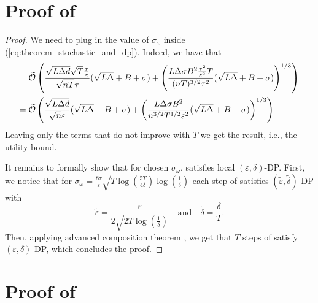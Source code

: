 \documentclass[a4paper,11pt]{article}
\begin{document}
\section{Proof of }\label{appendix:corollary_1}



\theoremdputility*

\begin{proof}
    We need to plug in the value of $\sigma_{\omega}$ inside (\ref{eq:theorem_stochastic_and_dp}). Indeed, we have that 
    \begin{align*}
        & \widetilde{\mathcal O}\left(\frac{\sqrt{L\Delta d} \sqrt{T}\frac{\tau}{\varepsilon}}{\sqrt{n T}\tau}(\sqrt{L\Delta} + B + \sigma)
        + \left(\frac{L\Delta\sigma B^2 \frac{\tau^2}{\varepsilon^2}T}{(nT)^{3/2}\tau^2}(\sqrt{L\Delta} + B + \sigma)\right)^{1/3}
        \right)\\
        =\;& \widetilde{\mathcal O}\left(\frac{\sqrt{L\Delta d} }{\sqrt{n}\varepsilon}(\sqrt{L\Delta} + B + \sigma)
        + \left(\frac{L\Delta\sigma B^2}{n^{3/2}T^{1/2}\varepsilon^2}(\sqrt{L\Delta} + B + \sigma)\right)^{1/3}
        \right)
    \end{align*}
    Leaving only the terms that do not improve with $T$ we get the result, i.e., the utility bound.

    It remains to formally show that for chosen $\sigma_{\omega}$,  satisfies local $(\varepsilon, \delta)$-DP. First, we notice that for $\sigma_{\omega} = \frac{8\tau}{\varepsilon}\sqrt{T\log\left(\frac{5T}{4\delta}\right)\log\left(\frac{1}{\delta}\right)}$ each step of  satisfies $(\tilde{\varepsilon}, \tilde{\delta})$-DP \citep[Theorem 3.22]{dwork2014algorithmic} with
    \begin{equation*}
        \tilde{\varepsilon} = \frac{\varepsilon}{2\sqrt{2T\log(\frac{1}{\delta})}} \quad \text{and}\quad \tilde{\delta} = \frac{\delta}{T}.
    \end{equation*}
    Then, applying advanced composition theorem \citep[Theorem 3.20 and Corollary 3.21 with $\delta' = \delta$]{dwork2014algorithmic}, we get that $T$ steps of  satisfy $(\varepsilon, \delta)$-DP, which concludes the proof.
\end{proof}


\section{Proof of }\label{appendix:stoch_proof_no_DP}
\end{document}
